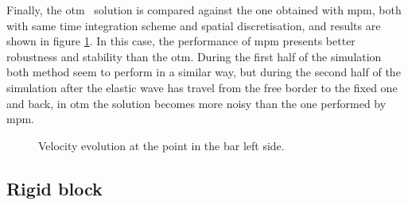 \documentclass[preprint,12pt,a4paper]{elsarticle}
\begin{document}
Finally, the \acrshort{otm}~\cite{Li2010} solution is compared against the one obtained with \acrshort{mpm}, both with same time integration scheme and spatial discretisation, and results are shown in figure \ref{fig:Dyka-OTM-MPM}. In
this case, the performance of \acrshort{mpm} presents better robustness and stability than the
\acrshort{otm}. During the first half of the simulation both method 
seem to perform in a similar way, but during the second half of the
simulation after the elastic wave has travel from the free border to
the fixed one and back, in \acrshort{otm} the solution becomes more noisy than the
one performed by \acrshort{mpm}.  
\begin{figure}
  \centering
  \caption{Velocity evolution at the point in the bar left side.}
  \label{fig:Dyka-OTM-MPM}
\end{figure}

\clearpage
\subsection{Rigid block}
\label{sec:andersen-block}
\end{document}
